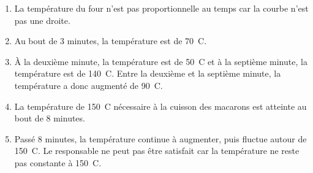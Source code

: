 
\medskip

\begin{enumerate}
\item La température du four n'est pas proportionnelle au temps car la courbe n'est pas
une droite.
\item Au bout de 3 minutes, la température est de 70~\degres C.
\item À la deuxième minute, la température est de 50~\degres C et à la septième minute, la
température est de 140~\degres C. Entre la deuxième et la septième minute, la température a
donc augmenté de 90~\degres C.
\item La température de 150~\degres C nécessaire à la cuisson des macarons est atteinte au bout
de 8 minutes.
\item Passé 8 minutes, la température continue à augmenter, puis fluctue autour de 150~\degres C. Le responsable ne peut pas être satisfait car la température ne reste pas constante
à 150~\degres C.
\end{enumerate}

\vspace{0,5cm}


